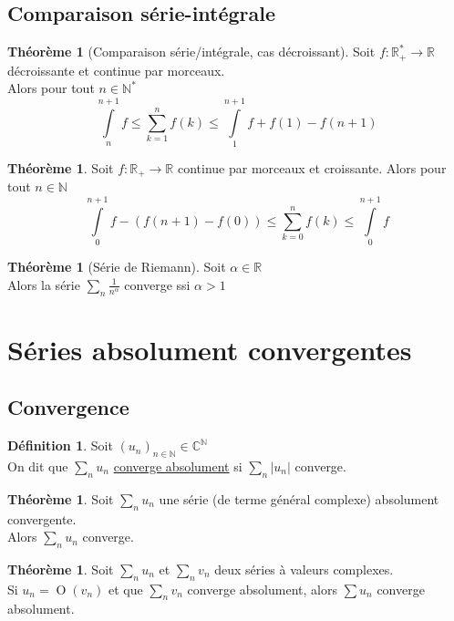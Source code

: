 \documentclass[10pt,a4paper]{article}
\theoremstyle{definition}
\newtheorem{theorem}[proposition]{Théorème}
\newtheorem{definition}[proposition]{Définition}
\DeclareMathOperator*{\dom}{O}
\begin{document}
\subsection{Comparaison série-intégrale}
\begin{theorem}[Comparaison série/intégrale, cas décroissant]
Soit $f: \mathbb{R}_+^* \to \mathbb{R}$ décroissante et continue par morceaux. \\
Alors pour tout $n \in \mathbb{N}^*$
\[\int\limits_n^{n + 1}f \leq \sum_{k = 1}^n f(k) \leq \int\limits_1^{n + 1}f + f(1) - f(n+1)\]
\end{theorem}
\begin{theorem}
Soit $f: \mathbb{R}_+ \to \mathbb{R}$ continue par morceaux et croissante. Alors pour tout $n \in \mathbb{N}$
\[\int\limits_{0}^{n + 1} f - ( f(n + 1) - f(0)) \leq \sum_{k = 0}^n f(k) \leq \int\limits_{0}^{n + 1} f\]
\end{theorem}
\begin{theorem}[Série de Riemann]
Soit $\alpha \in \mathbb{R}$ \\
Alors la série $\sum\limits_n \frac{1}{n^\alpha}$ converge ssi $\alpha > 1$
\end{theorem}

\section{Séries absolument convergentes}
\subsection{Convergence}
\begin{definition}
Soit $(u_n)_{n \in \mathbb{N}} \in \mathbb{C}^\mathbb{N}$ \\
On dit que $\sum\limits_n u_n$ \uline{converge absolument} si $\sum\limits_n |u_n|$ converge.
\end{definition}
\begin{theorem}
Soit $\sum\limits_n u_n$ une série (de terme général complexe) absolument convergente. \\
Alors $\sum\limits_n u_n$ converge.
\end{theorem}
\begin{theorem}
Soit $\sum\limits_n u_n$ et $\sum\limits_n v_n$ deux séries à valeurs complexes. \\
Si $u_n = \dom(v_n)$ et que $\sum\limits_n v_n$ converge absolument, alors $\sum u_n$ converge absolument.
\end{theorem}
\end{document}
